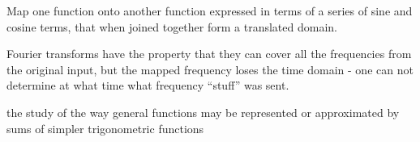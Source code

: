 \begin{definition}
    Map one function onto another function expressed in terms of a 
    series of sine and cosine terms, that when joined together form
    a translated domain.

    Fourier transforms have the property that they can cover all the frequencies
    from the original input, but the mapped frequency loses the time domain -
    one can not determine at what time what frequency ``stuff''  was sent.

\end{definition}

\begin{definition}
    the study of the way general functions may be represented or approximated
    by sums of simpler trigonometric functions

\end{definition}

